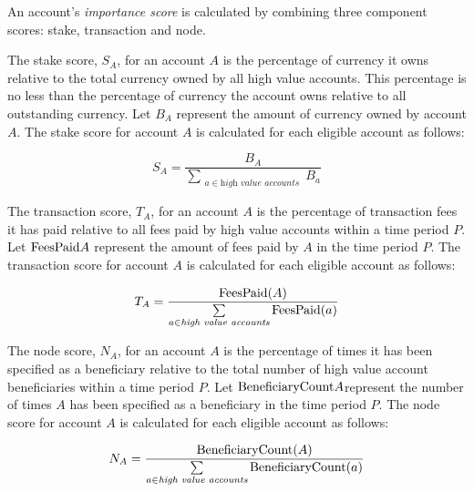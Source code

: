 An account's \emph{importance score} is calculated by combining three component scores: stake, transaction and node.

The stake score, $S_A$, for an account $A$ is the percentage of currency it owns relative to the total currency owned by all high value accounts.
This percentage is no less than the percentage of currency the account owns relative to all outstanding currency.
Let $B_A$ represent the amount of currency owned by account $A$.
The stake score for account $A$ is calculated for each eligible account as follows:

\begin{equation}
S_A = \frac{B_A}{\sum\limits_{\substack{a \in \textit{high value accounts}}} B_a}
\end{equation}

The transaction score, $T_A$, for an account $A$ is the percentage of transaction fees it has paid relative to all fees paid by high value accounts within a time period $P$.
Let $\mathrm{FeesPaid}{A}$ represent the amount of fees paid by $A$ in the time period $P$.
The transaction score for account $A$ is calculated for each eligible account as follows:

\begin{equation}
T_A = \frac{\mathrm{FeesPaid}(A)}{\sum\limits_{\substack{a \in \textit{high value accounts}}} \mathrm{FeesPaid}(a)}
\end{equation}

The node score, $N_A$, for an account $A$ is the percentage of times it has been specified as a beneficiary relative to the total number of high value account beneficiaries within a time period $P$.
Let $\mathrm{BeneficiaryCount}{A}$represent the number of times $A$ has been specified as a beneficiary in the time period $P$.
The node score for account $A$ is calculated for each eligible account as follows:

\begin{equation}
N_A = \frac{\mathrm{BeneficiaryCount}(A)}{\sum\limits_{\substack{a \in \textit{high value accounts}}} \mathrm{BeneficiaryCount}(a)}
\end{equation}

